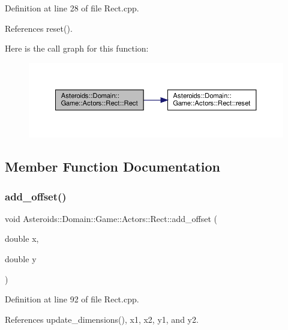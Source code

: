 Definition at line 28 of file Rect.\+cpp.



References reset().

Here is the call graph for this function\+:\nopagebreak
\begin{figure}[H]
\begin{center}
\leavevmode
\includegraphics[width=350pt]{classAsteroids_1_1Domain_1_1Game_1_1Actors_1_1Rect_a4e018b8938b343f70672695b58e5fa96_cgraph}
\end{center}
\end{figure}


\subsection{Member Function Documentation}
\mbox{\label{classAsteroids_1_1Domain_1_1Game_1_1Actors_1_1Rect_a0ab06f4fe6e0dbd681c89397f22aa08f}} 
\subsubsection{\texorpdfstring{add\+\_\+offset()}{add\_offset()}}
{\footnotesize\ttfamily void Asteroids\+::\+Domain\+::\+Game\+::\+Actors\+::\+Rect\+::add\+\_\+offset (\begin{DoxyParamCaption}\item[{double}]{x,  }\item[{double}]{y }\end{DoxyParamCaption})}



Definition at line 92 of file Rect.\+cpp.



References update\+\_\+dimensions(), x1, x2, y1, and y2.



